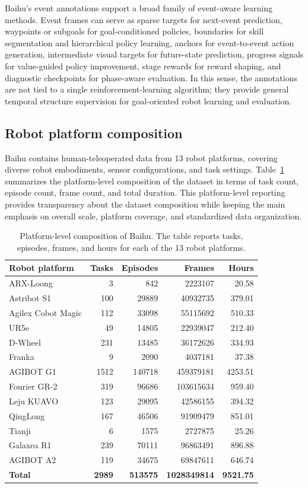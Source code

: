 Baihu's event annotations support a broad family of event-aware learning methods. Event frames can serve as sparse targets for next-event prediction, waypoints or subgoals for goal-conditioned policies, boundaries for skill segmentation and hierarchical policy learning, anchors for event-to-event action generation, intermediate visual targets for future-state prediction, progress signals for value-guided policy improvement, stage rewards for reward shaping, and diagnostic checkpoints for phase-aware evaluation. In this sense, the annotations are not tied to a single reinforcement-learning algorithm; they provide general temporal structure supervision for goal-oriented robot learning and evaluation.

\subsection{Robot platform composition}

Baihu contains human-teleoperated data from 13 robot platforms, covering diverse robot embodiments, sensor configurations, and task settings. Table~\ref{tab:platform-comp} summarizes the platform-level composition of the dataset in terms of task count, episode count, frame count, and total duration. This platform-level reporting provides transparency about the dataset composition while keeping the main emphasis on overall scale, platform coverage, and standardized data organization.

\begin{table}[t]
\centering
\caption{Platform-level composition of Baihu. The table reports tasks, episodes, frames, and hours for each of the 13 robot platforms.}
\label{tab:platform-comp}
\scriptsize
\begin{tabular}{lrrrr}
\toprule
Robot platform & Tasks & Episodes & Frames & Hours \\
\midrule
ARX-Loong & 3 & 842 & 2223107 & 20.58 \\
Astribot S1 & 100 & 29889 & 40932735 & 379.01 \\
Agilex Cobot Magic & 112 & 33098 & 55115692 & 510.33 \\
UR5e & 49 & 14805 & 22939047 & 212.40 \\
D-Wheel & 231 & 13485 & 36172626 & 334.93 \\
Franka & 9 & 2090 & 4037181 & 37.38 \\
AGIBOT G1 & 1512 & 140718 & 459379181 & 4253.51 \\
Fourier GR-2 & 319 & 96686 & 103615634 & 959.40 \\
Leju KUAVO & 123 & 29095 & 42586155 & 394.32 \\
QingLong & 167 & 46506 & 91909479 & 851.01 \\
Tianji & 6 & 1575 & 2727875 & 25.26 \\
Galaxea R1 & 239 & 70111 & 96863491 & 896.88 \\
AGIBOT A2 & 119 & 34675 & 69847611 & 646.74 \\
\textbf{Total} & \textbf{2989} & \textbf{513575} & \textbf{1028349814} & \textbf{9521.75} \\
\bottomrule
\end{tabular}
\end{table}

